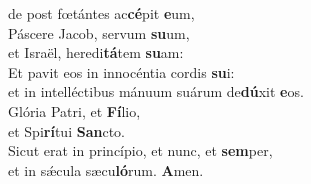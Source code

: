 \evenverse de post fœtántes ac\textbf{cé}pit \textbf{e}um,\\
\oddverse Páscere Jacob, servum \textbf{su}um,~\*\\
\oddverse et Israël, heredi\textbf{tá}tem \textbf{su}am:\\
\evenverse Et pavit eos in innocéntia cordis \textbf{su}i:~\*\\
\evenverse et in intelléctibus mánuum suárum de\textbf{dú}xit \textbf{e}os.\\
\oddverse Glória Patri, et \textbf{Fí}lio,~\*\\
\oddverse et Spi\textbf{rí}tui \textbf{San}cto.\\
\evenverse Sicut erat in princípio, et nunc, et \textbf{sem}per,~\*\\
\evenverse et in sǽcula sæcu\textbf{ló}rum. \textbf{A}men.\\
